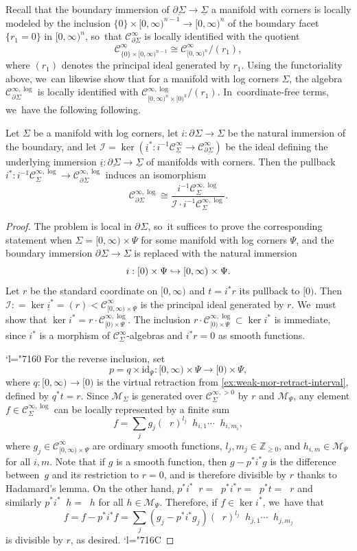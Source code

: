 \documentclass[JEP,XML,SOM,Unicode,NoFloatCountersInSection,published]{cedram}
\newcommand{\Changel}{\mathcode`l="7160}
\newcommand{\Changelback}{\mathcode`l="716C}
\newcommand\hto{\mathrel{\lhook\joinrel\to}}
\theoremstyle{definition}
\theoremstyle{remark}
\newcommand{\ZZ}{\mathbb{Z}}
\newcommand{\halfspc}[1]{[0,\infty)^{#1}}
\newcommand{\id}[1]{\mathrm{id}_{#1}}
\renewcommand{\ge}{\geqslant}
\newcommand{\ulog}{\mathop{\widetilde{\log}}\nolimits}
\newcommand{\defas}{\mathrel{\mathop:}=}
\newcommand{\cM}{\mathscr{M}}
\newcommand{\Cinf}[1]{\mathscr{C}^{\infty}_{#1}}
\newcommand{\Cinfpos}[1]{\mathscr{C}^{\infty, > 0}_{#1}}
\newcommand{\Cinflog}[1]{\mathscr{C}^{\infty,\log}_{#1}}
\newcommand{\Sig}{\Sigma}
\newcommand{\uSig}{\underline{\Sigma}}
\newcommand{\uPsi}{\underline{\Psi}}
\newcommand{\ubdSig}[1][]{\underline{\partial^{#1}\Sigma}}
\newcommand{\bdSig}[1][]{\partial^{#1}\Sigma}
\begin{document}
Recall that the boundary immersion of $\ubdSig \to \uSig$ a manifold with corners is locally modeled by the inclusion $\{0\} \times \halfspc{{n-1}} \to \halfspc{n}$ of the boundary facet $\{r_1=0\}$ in $\halfspc{{n}}$, so~that $\Cinf{\ubdSig}$ is locally identified with the quotient
\[
\Cinf{\{0\}\times\halfspc{n-1}}
\cong \Cinf{\halfspc{n}}/(r_1),
\]
where $(r_1)$ denotes the principal ideal generated by $r_1$. Using the functoriality above, we~can likewise show that for a manifold with log corners $\Sig$, the algebra $\Cinflog{\bdSig}$ is locally identified with $\Cinflog{\halfspc{n}\times[0)^k}/(r_1)$. In~coordinate-free terms, we~have the following following.
\begin{lemma}\label{lem:boundary-log-principal-ideal}
Let $\Sig$ be a manifold with log corners, let $i : \bdSig \to \Sig$ be the natural immersion of the boundary, and let $\mathscr{I} = \ker(\underline{i}^* : i^{-1}\Cinf{\uSig} \to \Cinf{\ubdSig})$ be the ideal defining the underlying immersion $\underline{i}: \ubdSig \to \uSig$ of manifolds with corners. Then the pullback $i^* : i^{-1}\Cinflog{\Sig} \to \Cinflog{\bdSig}$ induces an isomorphism
\[
\Cinflog{\bdSig} \cong \frac{i^{-1}\Cinflog{\Sig}}{\mathscr{I}\cdot i^{-1}\Cinflog{\Sig}}.
\]
\end{lemma}
\begin{proof}
The problem is local in $\bdSig$, so~it suffices to prove the corresponding statement when $\Sig = \halfspc{} \times \Psi$ for some manifold with log corners $\Psi$, and the boundary immersion $\bdSig \to \Sig$ is replaced with the natural immersion
\[
i : [0) \times \Psi \hto \halfspc{} \times \Psi.
\]
Let $r$ be the standard coordinate on $\halfspc{}$ and $t = i^*r$ its pullback to $[0)$. Then $\mathscr{I} \defas \ker{\underline{i}^*} = (r) < \Cinf{\halfspc{}\times \uPsi} $ is the principal ideal generated by $r$. We~must show that $\ker i^* = r \cdot \Cinflog{[0)\times\Psi}$.
The inclusion $r \cdot \Cinflog{[0)\times\Psi} \subset \ker i^*$ is immediate, since $i^*$ is a morphism of $\Cinf{\Sig}$-algebras and $i^*r = 0$ as smooth functions.

\Changel{}
For the reverse inclusion, set
\[
p = q \times \id{\Psi} : \halfspc{} \times {\Psi} \to [0) \times \Psi,
\]
where $q : \halfspc{} \to [0)$ is the virtual retraction from \autoref{ex:weak-mor-retract-interval}, defined by $q^*t = r$. Since $\cM_\Sig$ is generated over $\Cinfpos{\Sig}$ by $r$ and $\cM_{\Psi}$, any element $f \in \Cinflog{\Sig}$ can be locally represented by a finite sum
\[
f = \sum_j g_j (\ulog r)^{l_j} \ulog h_{i,1} \cdots \ulog h_{i,m_i},
\]
where $g_j \in \Cinf{\halfspc{}\times\uPsi}$ are ordinary smooth functions, $l_j,m_j \in \ZZ_{\ge 0}$, and $h_{i,m} \in \cM_{\Psi}$ for all $i,m$. Note that if $g$ is a smooth function, then $g - p^*i^*g$ is the difference between~$g$ and its restriction to $r=0$, and is therefore divisible by $r$ thanks to Hadamard's lemma. On the other hand, $p^*i^* \ulog r = \ulog p^*i^* r = \ulog p^* t = \ulog r$ and similarly $p^*i^*\ulog h = \ulog h$ for all $h \in \cM_{\Psi}$. Therefore, if $f \in \ker i^*$, we~have that
\[
f = f - p^*i^*f = \sum_j (g_j-p^*i^*g_j) (\ulog r)^{l_j} \ulog h_{j,1} \cdots \ulog h_{j,m_j}
\]
is divisible by $r$, as desired.
\Changelback
\end{proof}
\end{document}
